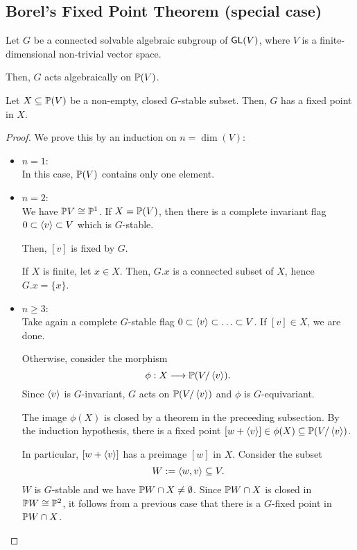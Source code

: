 \subsection{Borel's Fixed Point Theorem (special case)}

\begin{theorem}
	Let $G$ be a connected solvable algebraic subgroup of $\GL(V)$, where $V$ is a finite-dimensional non-trivial vector space.
	
	Then, $G$ acts algebraically on $\P(V)$.
	
	Let $X \subseteq\P(V)$ be a non-empty, closed $G$-stable subset. Then, $G$ has a fixed point in $X$.
\end{theorem}

\begin{proof}
	We prove this by an induction on $n = \dim(V)$:
	\begin{itemize}
		\item $n = 1$:\\
		In this case, $\P(V)$ contains only one element.
		\item $n = 2$:\\
		We have $\P V \isom{} \P^1$. If $X = \P(V)$, then there is a complete invariant flag $0 \subset \shrp{v} \subset V$ which is $G$-stable.
		
		Then, $[v]$ is fixed by $G$.
		
		If $X$ is finite, let $x \in X$. Then, $G.x$ is a connected subset of $X$, hence $G.x = \{x\}$.
		\item $n \geq 3$:\\
		Take again a complete $G$-stable flag $0 \subset \shrp{v} \subset \ldots \subset V$. If $[v] \in X$, we are done.
		
		Otherwise, consider the morphism
		\[ \phi : X \Pfeil{} \P(V / \shrp{v}). \]
		Since $\shrp{v}$ is $G$-invariant, $G$ acts on $\P(V / \shrp{v})$ and $\phi$ is $G$-equivariant.
		
		The image $\phi(X)$ is closed by a theorem in the preceeding subsection. By the induction hypothesis, there is a fixed point $[w + \shrp{v}] \in \phi(X) \subseteq \P(V / \shrp{v})$.
		
		In particular, $[w+\shrp{v}]$ has a preimage $[w]$ in $X$. Consider the subset
		\[ W := \shrp{w,v} \subseteq V. \]
		$W$ is $G$-stable and we have $\P W \cap X\neq \emptyset$. Since $\P W \cap X$ is closed in $\P W \isom{} \P^2$, it follows from a previous case that there is a $G$-fixed point in $\P W \cap X$.
	\end{itemize}
\end{proof}